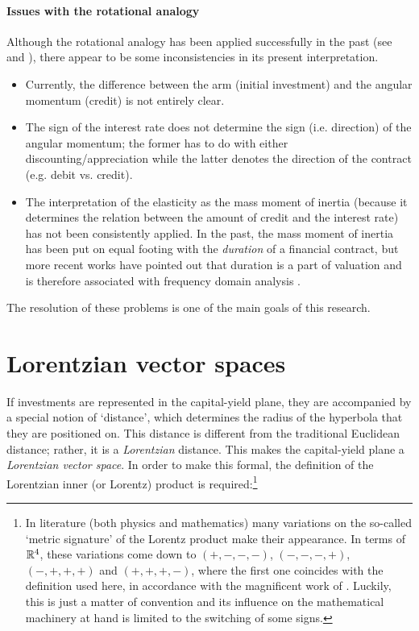 \paragraph{Issues with the rotational analogy} Although the rotational analogy has been applied successfully in the past (see \citet{Kruimer2021} and \citet{VanArdenne2020}), there appear to be some inconsistencies in its present interpretation. 
\begin{itemize}
    \item Currently, the difference between the arm (initial investment) and the angular momentum (credit) is not entirely clear.
    \item The sign of the interest rate does not determine the sign (i.e. direction) of the angular momentum; the former has to do with either discounting/appreciation while the latter denotes the direction of the contract (e.g. debit vs. credit).
    \item The interpretation of the elasticity as the mass moment of inertia (because it determines the relation between the amount of credit and the interest rate) has not been consistently applied. In the past, the mass moment of inertia has been put on equal footing with the \emph{duration} of a financial contract, but more recent works have pointed out that duration is a part of valuation and is therefore associated with frequency domain analysis \cite{Krabbenborg2021}.
\end{itemize}
The resolution of these problems is one of the main goals of this research.

\section{Lorentzian vector spaces}
\label{sec:lorentz_metric}
If investments are represented in the capital-yield plane, they are accompanied by a special notion of `distance', which determines the radius of the hyperbola that they are positioned on. This distance is different from the traditional Euclidean distance; rather, it is a \emph{Lorentzian} distance. This makes the capital-yield plane a \emph{Lorentzian vector space}. In order to make this formal, the definition of the Lorentzian inner (or Lorentz) product is required:\footnote{In literature (both physics and mathematics) many variations on the so-called `metric signature' of the Lorentz product make their appearance. In terms of \(\mathbb{R}^4\), these variations come down to \((+,-,-,-)\), \((-,-,-,+)\), \((-,+,+,+)\) and \((+,+,+,-)\), where the first one coincides with the definition used here, in accordance with the magnificent work of \citet{Landau1971}. Luckily, this is just a matter of convention and its influence on the mathematical machinery at hand is limited to the switching of some signs.}

